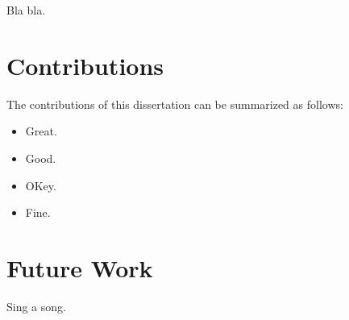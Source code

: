 Bla bla.

\section{Contributions}

The contributions of this dissertation can be summarized as follows:

\begin{itemize}
\item Great.
\item Good.
\item OKey.
\item Fine.
\end{itemize}

\section{Future Work}

Sing a song.
